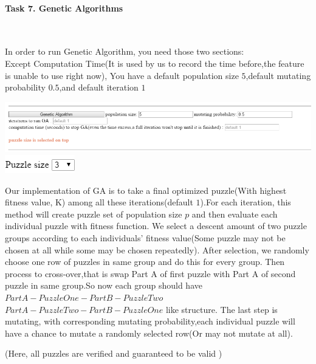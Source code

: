 \documentclass[12pt, letterpaper]{article}
\begin{document}
\pagebreak
\paragraph{Task 7. Genetic Algorithms} \mbox{}\\

\begin{large}
	In order to run Genetic Algorithm, you need those two sections:\\
	Except Computation Time(It is used by us to record the time before,the feature is unable to use right now), You have a default population size $5$,default mutating probability $0.5$,and default iteration $1$ \\
\end{large} 

\includegraphics[scale=0.6]{"Task 7/GA-section"}
\includegraphics[scale=0.6]{"Task 7/Puzzle-size"}\\

\begin{large}
	Our implementation of GA is to take a final optimized puzzle(With highest fitness value, K) among all these iterations(default $1$).For each iteration, this method will create puzzle set of population size  $p$ and then evaluate each individual puzzle with fitness function. We select a descent amount of two puzzle groups according to each individuals' fitness value(Some puzzle may not be chosen at all while some may be chosen repeatedly). After selection, we randomly choose one row of puzzles in same group and do this for every group. Then process to cross-over,that is swap Part A of first puzzle with Part A of second puzzle in same group.So now each group should have $PartA-PuzzleOne-PartB-PuzzleTwo$ $PartA-PuzzleTwo-PartB-PuzzleOne$ like structure. The last step is mutating, with corresponding mutating probability,each individual puzzle will have a chance to mutate a randomly selected row(Or may not mutate at all).
\end{large}


(Here, all puzzles are verified and guaranteed to be valid )\\
\end{document}
